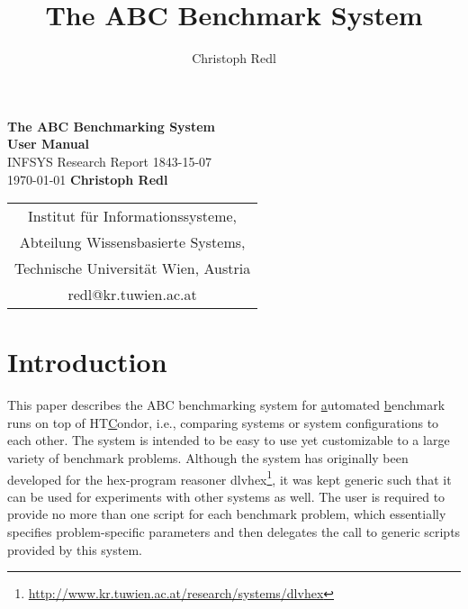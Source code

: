\documentclass[a4paper]{article}
\newcommand{\dlvhex}{{\sc dlvhex}}
\newcommand{\hex}{{\sc hex}}
\newcommand{\abcs}{{ABC}}
\begin{document}
	
	\title{The \abcs{} Benchmark System}
	\author{Christoph Redl}


\begin{titlepage}
    \centering
    \vfill
    \vskip2cm
        {\bfseries\Huge The \abcs{} Benchmarking System} \\[1em]
        {\bfseries\Huge User Manual} \\
        \vskip3.0cm
        {\sc\Large INFSYS Research Report 1843-15-07} \\
        \medskip
        {\Large \today}        
        \vskip2cm
        {\bfseries\Large
        Christoph Redl \\
        }    
        \vspace{1cm}
        \begin{tabular}{c}
        {\Large}
          Institut f\"ur Informationssysteme,\\
          Abteilung Wissensbasierte Systems,\\
          Technische Universit\"at Wien, Austria \\
          {redl@kr.tuwien.ac.at} \\[1ex]
        \end{tabular}
        \vspace{4cm}
	\restoregeometry
\end{titlepage}
	
	\section{Introduction}
	\label{sec:introduction}

		This paper describes the \abcs{} benchmarking system
		for \uline{a}utomated \uline{b}enchmark runs on top of HT\uline{C}ondor, i.e.,
		comparing systems or system configurations to each other.
		The system is intended to be easy to use yet customizable to a large variety of
		benchmark problems.
		Although the system has originally been developed for the \hex-program reasoner \dlvhex{}\footnote{\url{http://www.kr.tuwien.ac.at/research/systems/dlvhex}},
		it was kept generic such that it can be used for experiments with other systems as well.
		The user is required to provide no more than one script for each benchmark problem,
		which essentially specifies problem-specific parameters and then delegates the call
		to generic scripts provided by this system.
		
\end{document}
